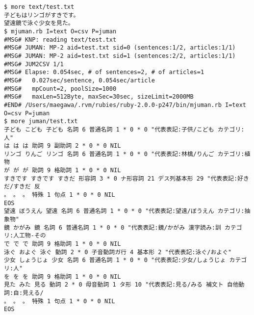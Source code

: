 \begin{Verbatim}[baselinestretch=0.7,frame=single]
$ more text/test.txt
子どもはリンゴがすきです。
望遠鏡で泳ぐ少女を見た。
$ mjuman.rb I=text O=csv P=juman
#MSG# KNP: reading text/test.txt
#MSG# JUMAN: MP-2 aid=test.txt sid=0 (sentences:1/2, articles:1/1)
#MSG# JUMAN: MP-2 aid=test.txt sid=1 (sentences:2/2, articles:1/1)
#MSG# JUM2CSV 1/1
#MSG# Elapse: 0.054sec, # of sentences=2, # of articles=1
#MSG#   0.027sec/sentence, 0.054sec/article
#MSG#   mpCount=2, poolSize=1000
#MSG#   maxLen=512Byte, maxSec=30sec, sizeLimit=2000MB
#END# /Users/maegawa/.rvm/rubies/ruby-2.0.0-p247/bin/mjuman.rb I=text O=csv P=juman
$ more juman/test.txt
子ども こども 子ども 名詞 6 普通名詞 1 * 0 * 0 "代表表記:子供/こども カテゴリ:人"
は は は 助詞 9 副助詞 2 * 0 * 0 NIL
リンゴ りんご リンゴ 名詞 6 普通名詞 1 * 0 * 0 "代表表記:林檎/りんご カテゴリ:植物
が が が 助詞 9 格助詞 1 * 0 * 0 NIL
すきです すきです すきだ 形容詞 3 * 0 ナ形容詞 21 デス列基本形 29 "代表表記:好きだ/すきだ 反
。 。 。 特殊 1 句点 1 * 0 * 0 NIL
EOS
望遠 ぼうえん 望遠 名詞 6 普通名詞 1 * 0 * 0 "代表表記:望遠/ぼうえん カテゴリ:抽象物"
鏡 かがみ 鏡 名詞 6 普通名詞 1 * 0 * 0 "代表表記:鏡/かがみ 漢字読み:訓 カテゴリ:人工物-その
で で で 助詞 9 格助詞 1 * 0 * 0 NIL
泳ぐ およぐ 泳ぐ 動詞 2 * 0 子音動詞ガ行 4 基本形 2 "代表表記:泳ぐ/およぐ"
少女 しょうじょ 少女 名詞 6 普通名詞 1 * 0 * 0 "代表表記:少女/しょうじょ カテゴリ:人"
を を を 助詞 9 格助詞 1 * 0 * 0 NIL
見た みた 見る 動詞 2 * 0 母音動詞 1 タ形 10 "代表表記:見る/みる 補文ト 自他動詞:自:見える/
。 。 。 特殊 1 句点 1 * 0 * 0 NIL
EOS
\end{Verbatim}
